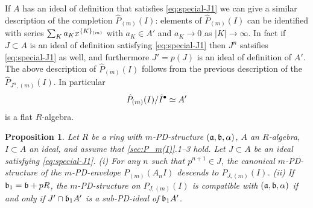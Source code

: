 \documentclass{article}
\theoremstyle{change}
\newtheorem{prop}[subsubsection]{Proposition}
\numberwithin{equation}{subsubsection}
\begin{document}
If $A$ has an ideal of definition that satisfies \ref{eq:special-J1}
we can give a similar description of the completion $\hat P_{(m)}(I)$:
elements of $\hat P_{(m)}(I)$ can be identified with series
$\sum_Ka_K{x}^{\{{K}\}_{(m)}}$ with $a_K\in A'$ and $a_K\to0$ as
$|K|\to\infty$. In fact if $J\subset A$ is an ideal of definition
satisfying  \ref{eq:special-J1} then $J^n$ satsifies
\ref{eq:special-J1} as well, and furthermore $J'=p(J)$ is an ideal of
definition of $A'$. The above description of $\hat P_{(m)}(I)$ follows
from the previous description of the $\hat P_{J^n,(m)}(I)$. In
particular
\begin{displaymath}
  \hat P_{(m)}(I)/\hat I^\bullet\simeq A'
\end{displaymath}
is a flat $R$-algebra.

\begin{prop}\label{prop:descent-of-m-PD-str-to-P/J}
  Let $R$ be a ring with $m$-PD-structure $({\mathfrak a},{\mathfrak b},\alpha)$, $A$ an
  $R$-algebra, $I\subset A$ an ideal, and assume that
  \ref{sec:P_m(I)}.1--3 hold. Let $J\subset A$ be an ideal satisfying
  \ref{eq:special-J1}. (i) For any $n$ such that $p^{n+1}\in J$, the
  canonical $m$-PD-structure of the $m$-PD-envelope $P_{(m)}(A_nI)$
  descends to $P_{J,(m)}(I)$. (ii) If ${\mathfrak b}_1={\mathfrak b}+pR$, the
  $m$-PD-structure on $P_{J,(m)}(I)$ is compatible with
  $({\mathfrak a},{\mathfrak b},\alpha)$ if and only if $J'\cap {\mathfrak b}_1A'$ is a sub-PD-ideal
  of ${\mathfrak b}_1A'$.
\end{prop}
\end{document}
